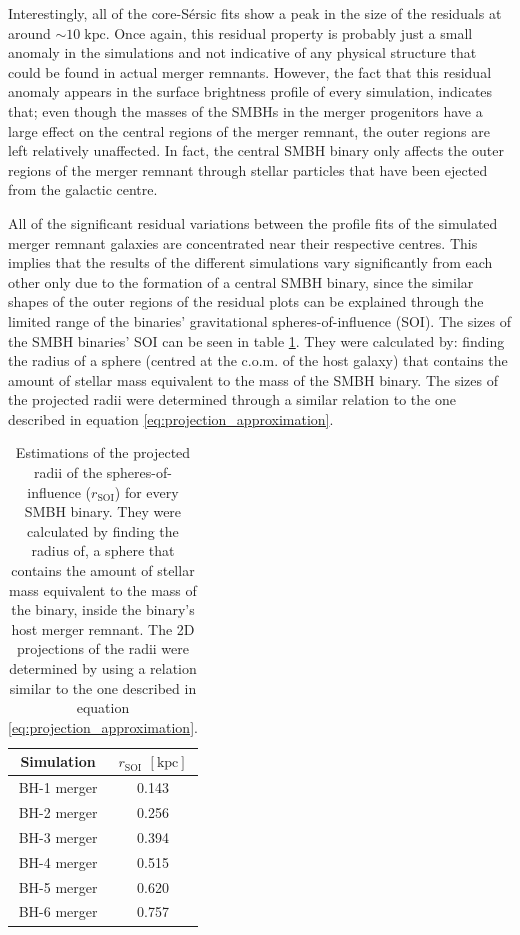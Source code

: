 \documentclass[english, oneside]{HYgradu}
\begin{document}
Interestingly, all of the core-Sérsic fits show a peak in the size of the residuals at around $\sim 10 \; \mathrm{kpc}$. Once again, this residual property is probably just a small anomaly in the simulations and not indicative of any physical structure that could be found in actual merger remnants. However, the fact that this residual anomaly appears in the surface brightness profile of every simulation, indicates that; even though the masses of the SMBHs in the merger progenitors have a large effect on the central regions of the merger remnant, the outer regions are left relatively unaffected. In fact, the central SMBH binary only affects the outer regions of the merger remnant through stellar particles that have been ejected from the galactic centre. 

All of the significant residual variations between the profile fits of the simulated merger remnant galaxies are concentrated near their respective centres. This implies that the results of the different simulations vary significantly from each other only due to the formation of a central SMBH binary, since the similar shapes of the outer regions of the residual plots can be explained through the limited range of the binaries' gravitational spheres-of-influence (SOI). The sizes of the SMBH binaries' SOI can be seen in table \ref{table:s-o-i}. They were calculated by: finding the radius of a sphere (centred at the c.o.m. of the host galaxy) that contains the amount of stellar mass equivalent to the mass of the SMBH binary. The sizes of the projected radii were determined through a similar relation to the one described in equation \ref{eq:projection_approximation}.


\begin{table}
	\begin{center}
		\begin{tabular}{| c | c |}
		\hline
		Simulation & $r_\mathrm{SOI}$ $\mathrm{[kpc]}$ \\
		\hline
		BH-1 merger & 0.143 \\
		BH-2 merger & 0.256 \\
		BH-3 merger & 0.394 \\
		BH-4 merger & 0.515 \\
		BH-5 merger & 0.620 \\
		BH-6 merger & 0.757 \\
		\hline
		\end{tabular}
	\end{center}
	\caption{Estimations of the projected radii of the spheres-of-influence ($r_\mathrm{SOI}$) for every SMBH binary. They were calculated by finding the radius of, a sphere that contains the amount of stellar mass equivalent to the mass of the binary, inside the binary's host merger remnant. The 2D projections of the radii were determined by using a relation similar to the one described in equation \ref{eq:projection_approximation}.}
	\label{table:s-o-i}
\end{table}
\end{document}

